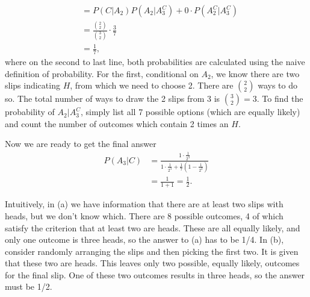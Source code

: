 \begin{exercise}[BH.2.13]
\begin{solution}
\begin{enumerate}
\begin{align*}
			&=P(C|A_{2})P(A_{2}|A_{3}^{C}) + 0\cdot P(A_{2}^{C}|A_{3}^{C})\\
			&=\frac{{2\choose 2}}{{3 \choose 2}}\cdot \frac{3}{7}\\
			& = \frac{1}{7},
		\end{align*}
		where on the second to last line, both probabilities are calculated using the naive definition of probability. For the first, conditional on $A_{2}$, we know there are two slips indicating $H$, from which we need to choose 2. There are ${2 \choose 2}$ ways to do so. The total number of ways to draw the 2 slips from 3 is ${3 \choose 2}=3$. To find the probability of $A_{2}|A_{3}^{C}$, simply list all 7 possible options (which are equally likely) and count the number of outcomes which contain 2 times an $H$.

		Now we are ready to get the final answer
		\begin{align*}
			P(A_{3}|C)& =  \frac{1\cdot \frac{1}{2^3}}{1\cdot \frac{1}{2^3} + \frac{1}{7}(1-\frac{1}{2^3})}\\
			&=\frac{1}{1+1}=\frac{1}{2}.
		\end{align*}

		Intuitively, in (a) we have information that there are at least two slips with heads, but we don't know which. There are 8 possible outcomes, 4 of which satisfy the criterion that at least two are heads. These are all equally likely, and only one outcome is three heads, so the answer to (a) has to be 1/4. In (b), consider randomly arranging the slips and then picking the first two. It is given that these two are heads. This leaves only two possible, equally likely, outcomes for the final slip. One of these two outcomes results in three heads, so the answer must be 1/2.
	\end{enumerate}
\end{solution}
\end{exercise}

